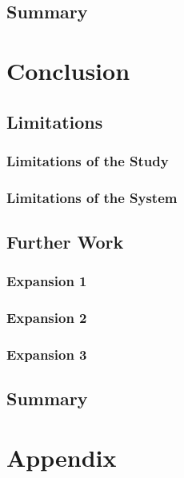 \documentclass[11pt, a4paper, twocolumn, twoside]{report}
\begin{document}
\section{Summary}

\chapter{Conclusion}

\section{Limitations}

\subsection{Limitations of the Study}

\subsection{Limitations of the System}

\section{Further Work}

\subsection{Expansion 1}

\subsection{Expansion 2}

\subsection{Expansion 3}

\section{Summary}
\onecolumn



\newpage

\chapter*{Appendix}
\end{document}
